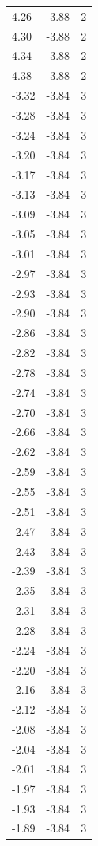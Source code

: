 \begin{longtable}{lrr}
  4.26 & -3.88 & 2 \\
  4.30 & -3.88 & 2 \\
  4.34 & -3.88 & 2 \\
  4.38 & -3.88 & 2 \\
  -3.32 & -3.84 & 3 \\
  -3.28 & -3.84 & 3 \\
  -3.24 & -3.84 & 3 \\
  -3.20 & -3.84 & 3 \\
  -3.17 & -3.84 & 3 \\
  -3.13 & -3.84 & 3 \\
  -3.09 & -3.84 & 3 \\
  -3.05 & -3.84 & 3 \\
  -3.01 & -3.84 & 3 \\
  -2.97 & -3.84 & 3 \\
  -2.93 & -3.84 & 3 \\
  -2.90 & -3.84 & 3 \\
  -2.86 & -3.84 & 3 \\
  -2.82 & -3.84 & 3 \\
  -2.78 & -3.84 & 3 \\
  -2.74 & -3.84 & 3 \\
  -2.70 & -3.84 & 3 \\
  -2.66 & -3.84 & 3 \\
  -2.62 & -3.84 & 3 \\
  -2.59 & -3.84 & 3 \\
  -2.55 & -3.84 & 3 \\
  -2.51 & -3.84 & 3 \\
  -2.47 & -3.84 & 3 \\
  -2.43 & -3.84 & 3 \\
  -2.39 & -3.84 & 3 \\
  -2.35 & -3.84 & 3 \\
  -2.31 & -3.84 & 3 \\
  -2.28 & -3.84 & 3 \\
  -2.24 & -3.84 & 3 \\
  -2.20 & -3.84 & 3 \\
  -2.16 & -3.84 & 3 \\
  -2.12 & -3.84 & 3 \\
  -2.08 & -3.84 & 3 \\
  -2.04 & -3.84 & 3 \\
  -2.01 & -3.84 & 3 \\
  -1.97 & -3.84 & 3 \\
  -1.93 & -3.84 & 3 \\
  -1.89 & -3.84 & 3 \\

\end{longtable}
